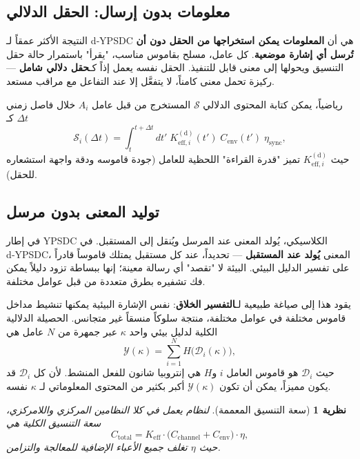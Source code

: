 \documentclass[12pt,a4paper]{article}
\newtheorem{theorem}{نظرية}[section]
\theoremstyle{remark}
\begin{document}
	\subsection{معلومات بدون إرسال: الحقل الدلالي}
	\label{subsec:semantic-field}
	
	النتيجة الأكثر عمقاً لـ d‑YPSDC هي أن \textbf{المعلومات يمكن استخراجها من الحقل دون أن تُرسل أي إشارة موضعية}. كل عامل، مسلح بقاموس مناسب، "يقرأ" باستمرار حالة حقل التنسيق ويحولها إلى معنى قابل للتنفيذ. الحقل نفسه يعمل إذاً كـ\textbf{حقل دلالي شامل} — ركيزة تحمل معنى كامناً، لا يتفعَّل إلا عند التفاعل مع مراقب مستعد.
	
	رياضياً، يمكن كتابة المحتوى الدلالي \(\mathcal{S}\) المستخرج من قبل عامل \(A_i\) خلال فاصل زمني \(\Delta t\) كـ
	\begin{equation}
		\mathcal{S}_i(\Delta t) = \int_{t}^{t+\Delta t} dt' \;
		K_{\mathrm{eff},i}^{\mathrm{(d)}}(t') \; C_{\mathrm{env}}(t') \; \eta_{\mathrm{sync}},
		\label{eq:semantic-content}
	\end{equation}
	حيث \(K_{\mathrm{eff},i}^{\mathrm{(d)}}\) تميز "قدرة القراءة" اللحظية للعامل (جودة قاموسه ودقة واجهة استشعاره للحقل).
	
	\subsection{توليد المعنى بدون مرسل}
	\label{subsec:meaning-generation}
	
	في إطار YPSDC الكلاسيكي، يُولد المعنى عند المرسل ويُنقل إلى المستقبل. في d‑YPSDC، المعنى \textbf{يُولد عند المستقبل} — تحديداً، عند كل مستقبل يمتلك قاموساً قادراً على تفسير الدليل البيئي. البيئة لا "تقصد" أي رسالة معينة؛ إنها ببساطة تزود دليلاً يمكن فك تشفيره بطرق متعددة من قبل عوامل مختلفة.
	
	يقود هذا إلى صياغة طبيعية لـ\textbf{التفسير الخلاق}: نفس الإشارة البيئية يمكنها تنشيط مداخل قاموس مختلفة في عوامل مختلفة، منتجة سلوكاً منسقاً غير متجانس. الحصيلة الدلالية الكلية لدليل بيئي واحد \(\kappa\) عبر جمهرة من \(N\) عامل هي
	\begin{equation}
		\mathcal{Y}(\kappa) = \sum_{i=1}^{N} H\bigl(\mathcal{D}_i(\kappa)\bigr),
		\label{eq:semantic-yield}
	\end{equation}
	حيث \(\mathcal{D}_i\) هو قاموس العامل \(i\) و\(H\) هي إنتروبيا شانون للفعل المنشط. لأن كل \(\mathcal{D}_i\) قد يكون مميزاً، يمكن أن تكون \( \mathcal{Y}(\kappa)\) أكبر بكثير من المحتوى المعلوماتي لـ \(\kappa\) نفسه.
	
	\begin{theorem}[سعة التنسيق المعممة]
		لنظام يعمل في كلا النظامين المركزي واللامركزي، سعة التنسيق الكلية هي
		\begin{equation}
			\boxed{C_{\mathrm{total}} = K_{\mathrm{eff}} \cdot \bigl( C_{\mathrm{channel}} + C_{\mathrm{env}} \bigr) \cdot \eta},
			\label{eq:generalized-capacity}
		\end{equation}
		حيث \(\eta\) تغلف جميع الأعباء الإضافية للمعالجة والتزامن.
	\end{theorem}
	
\end{document}
